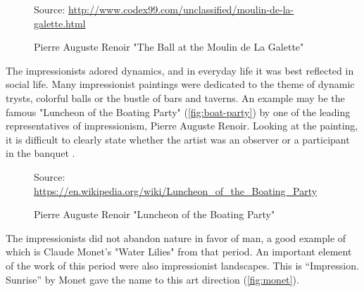 \documentclass{report}
\begin{document}
\begin{figure}[h]
\center
{} {Source: \url{http://www.codex99.com/unclassified/moulin-de-la-galette.html}}
\caption{Pierre Auguste Renoir "The Ball at the Moulin de La Galette"}
\label{fig:moulin}
\end{figure}

The impressionists adored dynamics, and in everyday life it was best reflected in social life. Many impressionist paintings were dedicated to the theme of dynamic trysts, colorful balls or the bustle of bars and taverns. An example may be the famous "Luncheon of the Boating Party" (\autoref{fig:boat-party}) by one of the leading representatives of impressionism, Pierre Auguste Renoir. Looking at the painting, it is difficult to clearly state whether the artist was an observer or a participant in the banquet \cite{BOOK:4}.

\begin{figure}[h]
\center
{} {Source: \url{https://en.wikipedia.org/wiki/Luncheon_of_the_Boating_Party}}
\caption{Pierre Auguste Renoir "Luncheon of the Boating Party"}
\label{fig:boat-party}
\end{figure}

The impressionists did not abandon nature in favor of man, a good example of which is Claude Monet's "Water Lilies" from that period. An important element of the work of this period were also impressionist landscapes. This is “Impression. Sunrise” by Monet gave the name to this art direction (\autoref{fig:monet}).
\end{document}

